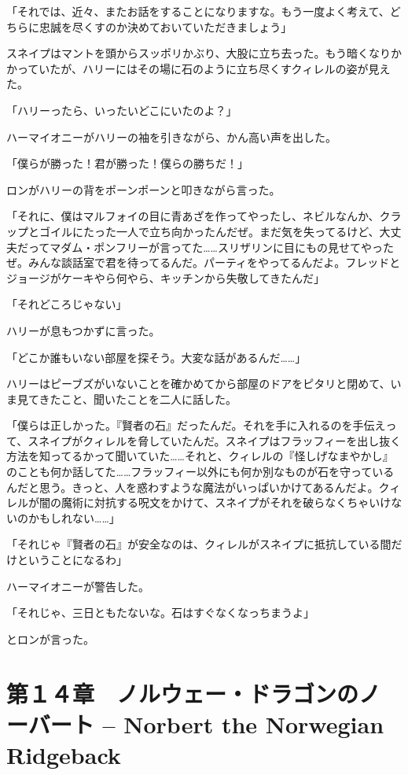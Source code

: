 \documentclass[10pt,a4paper]{article}
\begin{document}
\begin{CJK}{UTF8}{min}
「それでは、近々、またお話をすることになりますな。もう一度よく考えて、どちらに忠誠を尽くすのか決めておいていただきましょう」

スネイプはマントを頭からスッポリかぶり、大股に立ち去った。もう暗くなりかかっていたが、ハリーにはその場に石のように立ち尽くすクィレルの姿が見えた。



「ハリーったら、いったいどこにいたのよ？」

ハーマイオニーがハリーの袖を引きながら、かん高い声を出した。

「僕らが勝った！君が勝った！僕らの勝ちだ！」

ロンがハリーの背をポーンポーンと叩きながら言った。

「それに、僕はマルフォイの目に青あざを作ってやったし、ネビルなんか、クラップとゴイルにたった一人で立ち向かったんだぜ。まだ気を失ってるけど、大丈夫だってマダム・ポンフリーが言ってた……スリザリンに目にもの見せてやったぜ。みんな談話室で君を待ってるんだ。パーティをやってるんだよ。フレッドとジョージがケーキやら何やら、キッチンから失敬してきたんだ」

「それどころじゃない」

ハリーが息もつかずに言った。

「どこか誰もいない部屋を探そう。大変な話があるんだ……」

ハリーはピーブズがいないことを確かめてから部屋のドアをピタリと閉めて、いま見てきたこと、聞いたことを二人に話した。

「僕らは正しかった。『賢者の石』だったんだ。それを手に入れるのを手伝えって、スネイプがクィレルを脅していたんだ。スネイプはフラッフィーを出し抜く方法を知ってるかって聞いていた……それと、クィレルの『怪しげなまやかし』のことも何か話してた……フラッフィー以外にも何か別なものが石を守っているんだと思う。きっと、人を惑わすような魔法がいっぱいかけてあるんだよ。クィレルが闇の魔術に対抗する呪文をかけて、スネイプがそれを破らなくちゃいけないのかもしれない……」

「それじゃ『賢者の石』が安全なのは、クィレルがスネイプに抵抗している間だけということになるわ」

ハーマイオニーが警告した。

「それじゃ、三日ともたないな。石はすぐなくなっちまうよ」

とロンが言った。




\section{第１４章　ノルウェー・ドラゴンのノーバート -- Norbert the Norwegian Ridgeback}






\end{CJK}
\end{document}
